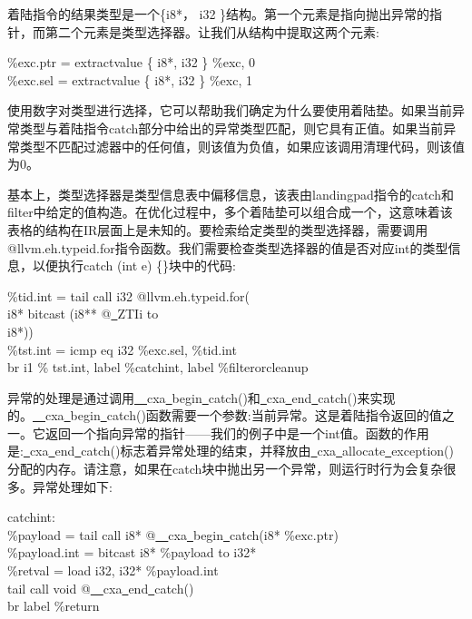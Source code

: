 着陆指令的结果类型是一个\{i8*， i32 \}结构。第一个元素是指向抛出异常的指针，而第二个元素是类型选择器。让我们从结构中提取这两个元素:\par

\begin{tcolorbox}[colback=white,colframe=black]
\%exc.ptr = extractvalue \{ i8*, i32 \} \%exc, 0 \\
\%exc.sel = extractvalue \{ i8*, i32 \} \%exc, 1
\end{tcolorbox}

使用数字对类型进行选择，它可以帮助我们确定为什么要使用着陆垫。如果当前异常类型与着陆指令catch部分中给出的异常类型匹配，则它具有正值。如果当前异常类型不匹配过滤器中的任何值，则该值为负值，如果应该调用清理代码，则该值为0。\par

基本上，类型选择器是类型信息表中偏移信息，该表由landingpad指令的catch和filter中给定的值构造。在优化过程中，多个着陆垫可以组合成一个，这意味着该表格的结构在IR层面上是未知的。要检索给定类型的类型选择器，需要调用@llvm.eh.typeid.for指令函数。我们需要检查类型选择器的值是否对应int的类型信息，以便执行catch (int e) \{\}块中的代码:\par

\begin{tcolorbox}[colback=white,colframe=black]
\%tid.int = tail call i32 @llvm.eh.typeid.for( \\
\hspace*{6cm}i8* bitcast (i8** @\underline{~}ZTIi to  \\
\hspace*{6cm}i8*)) \\
\%tst.int = icmp eq i32 \%exc.sel, \%tid.int \\
br i1 \% tst.int, label \%catchint, label \%filterorcleanup
\end{tcolorbox}

异常的处理是通过调用\underline{~~}cxa\underline{~}begin\underline{~}catch()和\underline{~}cxa\underline{~}end\underline{~}catch()来实现的。\underline{~~}cxa\underline{~}begin\underline{~}catch()函数需要一个参数:当前异常。这是着陆指令返回的值之一。它返回一个指向异常的指针——我们的例子中是一个int值。函数的作用是:\underline{~}cxa\underline{~}end\underline{~}catch()标志着异常处理的结束，并释放由\underline{~}cxa\underline{~}allocate\underline{~}ex\allowbreak ception()分配的内存。请注意，如果在catch块中抛出另一个异常，则运行时行为会复杂很多。异常处理如下:\par

\begin{tcolorbox}[colback=white,colframe=black]
catchint: \\
\%payload = tail call i8* @\underline{~~}cxa\underline{~}begin\underline{~}catch(i8* \%exc.ptr) \\
\%payload.int = bitcast i8* \%payload to i32* \\
\%retval = load i32, i32* \%payload.int \\
tail call void @\underline{~~}cxa\underline{~}end\underline{~}catch() \\
br label \%return
\end{tcolorbox}

